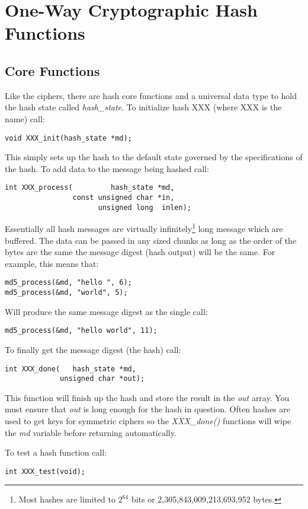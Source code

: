 \documentclass[synpaper]{book}
\newcommand{\mysection}[1]    %
	{                   %
	\section{#1}
   \markboth{\textsf{www.libtom.org}}{\thesection ~ {#1}}
	}
\begin{document}
\chapter{One-Way Cryptographic Hash Functions}
\mysection{Core Functions}
Like the ciphers, there are hash core functions and a universal data type to hold the hash state called \textit{hash\_state}.  To initialize hash
XXX (where XXX is the name) call:
\begin{verbatim}
void XXX_init(hash_state *md);
\end{verbatim}

This simply sets up the hash to the default state governed by the specifications of the hash.  To add data to the message being hashed call:
\begin{verbatim}
int XXX_process(         hash_state *md,
                const unsigned char *in,
                      unsigned long  inlen);
\end{verbatim}
Essentially all hash messages are virtually infinitely\footnote{Most hashes are limited to $2^{64}$ bits or 2,305,843,009,213,693,952 bytes.} long message which
are buffered.  The data can be passed in any sized chunks as long as the order of the bytes are the same the message digest (hash output) will be the same.  For example,
this means that:
\begin{verbatim}
md5_process(&md, "hello ", 6);
md5_process(&md, "world", 5);
\end{verbatim}
Will produce the same message digest as the single call:
\begin{verbatim}
md5_process(&md, "hello world", 11);
\end{verbatim}

To finally get the message digest (the hash) call:
\begin{verbatim}
int XXX_done(   hash_state *md,
             unsigned char *out);
\end{verbatim}

This function will finish up the hash and store the result in the \textit{out} array.  You must ensure that \textit{out} is long
enough for the hash in question.  Often hashes are used to get keys for symmetric ciphers so the \textit{XXX\_done()} functions
will wipe the \textit{md} variable before returning automatically.

To test a hash function call:
\begin{verbatim}
int XXX_test(void);
\end{verbatim}
\end{document}
